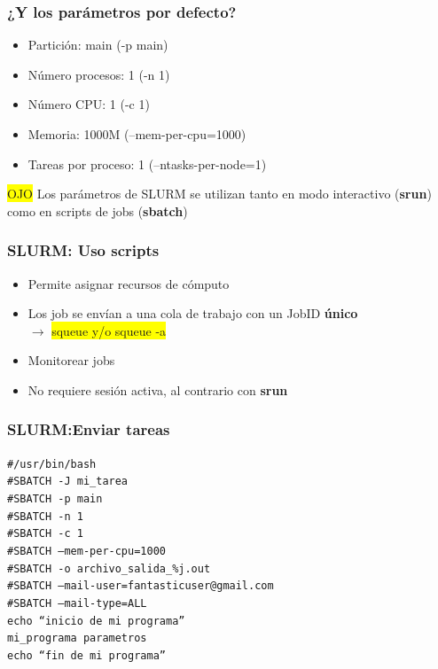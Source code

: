 \documentclass[aspectratio=169,professionalfonts]{beamer}
\newcommand{\hl}[1]{\colorbox{yellow}{#1}}
\begin{document}
\begin{frame}[fragile]
\frametitle{\textbf{¿Y los parámetros por defecto?}}
\begin{itemize}
    \item Partición: main  (-p main)
    \vspace{0.5em}
    \item  Número procesos: 1  (-n 1)
    \vspace{0.5em}
    \item Número CPU: 1 (-c 1)
    \vspace{0.5em}
    \item  Memoria: 1000M (--mem-per-cpu=1000)
    \vspace{0.5em}
    \item Tareas por proceso: 1 (--ntasks-per-node=1)
\end{itemize}
    \hl{OJO} Los parámetros de SLURM se utilizan tanto en modo interactivo (\textbf{srun}) como en scripts de jobs (\textbf{sbatch})
\end{frame}
\begin{frame} [fragile]
\frametitle{\textbf{SLURM: Uso scripts}}
    \begin{itemize}
        \item Permite asignar recursos de cómputo 
         \vspace{0.5em} 
        \item Los job se envían a una cola de trabajo con un JobID \textbf{único} \\ $\rightarrow$ \hl{squeue y/o squeue -a}
         \vspace{0.5em} 
        \item  Monitorear jobs
         \vspace{0.5em} 
        \item No requiere sesión activa, al contrario con \textbf{srun}
    \end{itemize}
\end{frame}


\begin{frame}[fragile]
\frametitle{\textbf{SLURM:Enviar tareas}}
    \texttt{\#\!/usr/bin/bash} \\
\texttt{\#SBATCH -J mi\_tarea} \\
\texttt{\#SBATCH -p main} \\
\texttt{\#SBATCH -n 1} \\
\texttt{\#SBATCH -c 1} \\
\texttt{\#SBATCH --mem-per-cpu=1000} \\
\texttt{\#SBATCH -o archivo\_salida\_\%j.out} \\
\texttt{\#SBATCH --mail-user=fantasticuser@gmail.com} \\
    \texttt{\#SBATCH --mail-type=ALL} \\
    \texttt{echo ``inicio de mi programa''} \\
\texttt{mi\_programa parametros} \\
\texttt{echo ``fin de mi programa''} \\
\end{frame}
    
\end{document}
